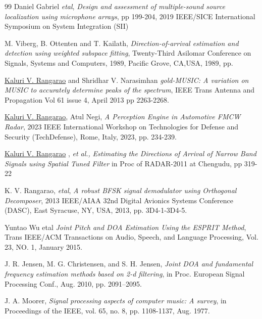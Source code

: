 \begin{thebibliography}{99}
Daniel Gabriel {\em etal}, {\em Design and assessment of multiple-sound source localization using microphone arrays}, pp 199-204, 2019 IEEE/SICE International Symposium on System Integration (SII)	

M. Viberg, B. Ottenten and T. Kailath, {\em Direction-of-arrival estimation and detection using weighted subspace fitting}, Twenty-Third Asilomar Conference on Signals, Systems and Computers, 1989, Pacific Grove, CA,USA, 1989, pp. 	

\href{http://ieeexplore.ieee.org/document/6376104/}{Kaluri V. Rangarao}
and Shridhar V. Narasimhan
{\em gold-MUSIC: A variation on MUSIC to accurately determine peaks of the spectrum},
IEEE Trans Antenna and Propagation Vol 61 issue 4, April 2013 pp 2263-2268.

{\href{https://ieeexplore.ieee.org/document/10380840}{Kaluri V. Rangarao}}, 
Atul Negi, {\em A Perception Engine in Automotive FMCW Radar}, 
2023 IEEE International Workshop on Technologies for Defense and Security (TechDefense), 
Rome, Italy, 2023, pp. 234-239.

\href{http://ieeexplore.ieee.org/document/6159541/}{Kaluri V. Rangarao}
, {\em et al.,}
{\em Estimating the Directions of Arrival of Narrow
	Band Signals using Spatial Tuned Filter} in
Proc of RADAR-2011 at Chengudu, pp 319-22

K. V. Rangarao, {\em etal}, {\em A robust BFSK signal demodulator using Orthogonal Decomposer}, 2013 IEEE/AIAA 32nd Digital Avionics Systems Conference (DASC), East Syracuse, NY, USA, 2013, pp. 3D4-1-3D4-5.

Yuntao Wu etal {\em Joint Pitch and DOA Estimation Using the ESPRIT Method}, 
Trans IEEE/ACM Transactions on Audio, Speech, and Language Processing, Vol. 23, NO. 1, January 2015.

J. R. Jensen, M. G. Christensen, and S. H. Jensen, {\em Joint 	DOA and fundamental frequency estimation methods based on 2-d filtering}, in Proc. European Signal Processing Conf., Aug. 2010, pp. 2091–2095.

J. A. Moorer, {\em Signal processing aspects of computer music: A survey}, 
in Proceedings of the IEEE, vol. 65, no. 8, pp. 1108-1137, Aug. 1977.


\end{thebibliography}

